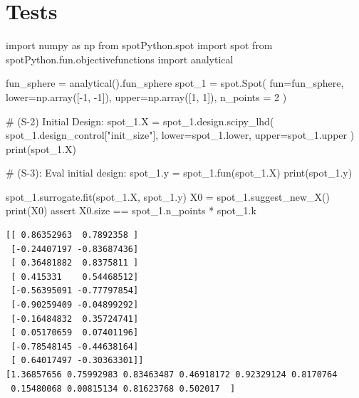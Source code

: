 \documentclass[
  letterpaper,
  DIV=11,
  numbers=noendperiod]{scrreprt}
\newenvironment{Shaded}{\begin{snugshade}}{\end{snugshade}}
\newcommand{\BuiltInTok}[1]{\textcolor[rgb]{0.00,0.23,0.31}{#1}}
\newcommand{\CommentTok}[1]{\textcolor[rgb]{0.37,0.37,0.37}{#1}}
\newcommand{\ControlFlowTok}[1]{\textcolor[rgb]{0.00,0.23,0.31}{#1}}
\newcommand{\DecValTok}[1]{\textcolor[rgb]{0.68,0.00,0.00}{#1}}
\newcommand{\ImportTok}[1]{\textcolor[rgb]{0.00,0.46,0.62}{#1}}
\newcommand{\NormalTok}[1]{\textcolor[rgb]{0.00,0.23,0.31}{#1}}
\newcommand{\OperatorTok}[1]{\textcolor[rgb]{0.37,0.37,0.37}{#1}}
\newcommand{\StringTok}[1]{\textcolor[rgb]{0.13,0.47,0.30}{#1}}
\begin{document}
\hypertarget{tests}{%
\section{Tests}\label{tests}}

\begin{Shaded}
\begin{Highlighting}[]
\ImportTok{import}\NormalTok{ numpy }\ImportTok{as}\NormalTok{ np}
\ImportTok{from}\NormalTok{ spotPython.spot }\ImportTok{import}\NormalTok{ spot}
\ImportTok{from}\NormalTok{ spotPython.fun.objectivefunctions }\ImportTok{import}\NormalTok{ analytical}

\NormalTok{fun\_sphere }\OperatorTok{=}\NormalTok{ analytical().fun\_sphere}
\NormalTok{spot\_1 }\OperatorTok{=}\NormalTok{ spot.Spot(}
\NormalTok{    fun}\OperatorTok{=}\NormalTok{fun\_sphere,}
\NormalTok{    lower}\OperatorTok{=}\NormalTok{np.array([}\OperatorTok{{-}}\DecValTok{1}\NormalTok{, }\OperatorTok{{-}}\DecValTok{1}\NormalTok{]),}
\NormalTok{    upper}\OperatorTok{=}\NormalTok{np.array([}\DecValTok{1}\NormalTok{, }\DecValTok{1}\NormalTok{]),}
\NormalTok{    n\_points }\OperatorTok{=} \DecValTok{2}
\NormalTok{)}

\CommentTok{\# (S{-}2) Initial Design:}
\NormalTok{spot\_1.X }\OperatorTok{=}\NormalTok{ spot\_1.design.scipy\_lhd(}
\NormalTok{    spot\_1.design\_control[}\StringTok{"init\_size"}\NormalTok{], lower}\OperatorTok{=}\NormalTok{spot\_1.lower, upper}\OperatorTok{=}\NormalTok{spot\_1.upper}
\NormalTok{)}
\BuiltInTok{print}\NormalTok{(spot\_1.X)}

\CommentTok{\# (S{-}3): Eval initial design:}
\NormalTok{spot\_1.y }\OperatorTok{=}\NormalTok{ spot\_1.fun(spot\_1.X)}
\BuiltInTok{print}\NormalTok{(spot\_1.y)}

\NormalTok{spot\_1.surrogate.fit(spot\_1.X, spot\_1.y)}
\NormalTok{X0 }\OperatorTok{=}\NormalTok{ spot\_1.suggest\_new\_X()}
\BuiltInTok{print}\NormalTok{(X0)}
\ControlFlowTok{assert}\NormalTok{ X0.size }\OperatorTok{==}\NormalTok{ spot\_1.n\_points }\OperatorTok{*}\NormalTok{ spot\_1.k}
\end{Highlighting}
\end{Shaded}

\begin{verbatim}
[[ 0.86352963  0.7892358 ]
 [-0.24407197 -0.83687436]
 [ 0.36481882  0.8375811 ]
 [ 0.415331    0.54468512]
 [-0.56395091 -0.77797854]
 [-0.90259409 -0.04899292]
 [-0.16484832  0.35724741]
 [ 0.05170659  0.07401196]
 [-0.78548145 -0.44638164]
 [ 0.64017497 -0.30363301]]
[1.36857656 0.75992983 0.83463487 0.46918172 0.92329124 0.8170764
 0.15480068 0.00815134 0.81623768 0.502017  ]
\end{verbatim}
\end{document}

